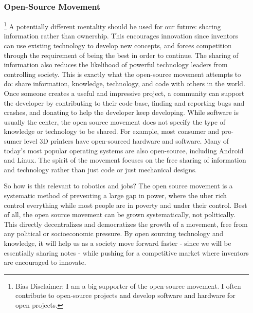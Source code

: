 \subsubsection{Open-Source Movement} 
\footnote{Bias Disclaimer: I am a big supporter of the open-source movement. I often contribute to open-source projects and develop software and hardware for open projects.}
\label{subsec:open-source} 
A potentially different mentality should be used for our future: sharing information rather than ownership. This encourages innovation since inventors can use existing technology to develop new concepts, and forces competition through the requirement of being the best in order to continue. The sharing of information also reduces the likelihood of powerful technology leaders from controlling society. This is exactly what the open-source movement attempts to do: share information, knowledge, technology, and code with others in the world. Once someone creates a useful and impressive project, a community can support the developer by contributing to their code base, finding and reporting bugs and crashes, and donating to help the developer keep developing. While software is usually the center, the open source movement does not specify the type of knowledge or technology to be shared. For example, most consumer and pro-sumer level 3D printers have open-sourced hardware and software. Many of today's most popular operating systems are also open-source, including Android and Linux. The spirit of the movement focuses on the free sharing of information and technology rather than just code or just mechanical designs. %

So how is this relevant to robotics and jobs? The open source movement is a systematic method of preventing a large gap in power, where the uber rich control everything while most people are in poverty and under their control. Best of all, the open source movement can be grown systematically, not politically. This directly decentralizes and democratizes the growth of a movement, free from any political or socioeconomic pressure. By open sourcing technology and knowledge, it will help us as a society move forward faster - since we will be essentially sharing notes - while pushing for a competitive market where inventors are encouraged to innovate. 

